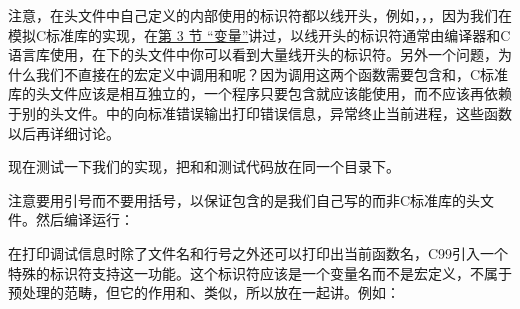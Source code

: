 

注意，在头文件中自己定义的内部使用的标识符都以\BookCode{\_\BookSplit{}}线开头，例如，，，因为我们在模拟C标准库的实现，在\hyperlink{db.expr.variable}{第 3 节 “变量”}讲过，以\BookCode{\_\BookSplit{}}线开头的标识符通常由编译器和C语言库使用，在下的头文件中你可以看到大量\BookCode{\_\BookSplit{}}线开头的标识符。另外一个问题，为什么我们不直接在的宏定义中调用和呢？因为调用这两个函数需要包含和，C标准库的头文件应该是相互独立的，一个程序只要包含就应该能使用，而不应该再依赖于别的头文件。中的向标准错误输出打印错误信息，异常终止当前进程，这些函数以后再详细讨论。



现在测试一下我们的实现，把和和测试代码放在同一个目录下。




注意要用\BookCode{\BookQuoteChar{}}引号而不要用\BookCode{\textless{}\textgreater{}}括号，以保证包含的是我们自己写的而非C标准库的头文件。然后编译运行：




在打印调试信息时除了文件名和行号之外还可以打印出当前函数名，C99引入一个特殊的标识符支持这一功能。这个标识符应该是一个变量名而不是宏定义，不属于预处理的范畴，但它的作用和、类似，所以放在一起讲。例如：





